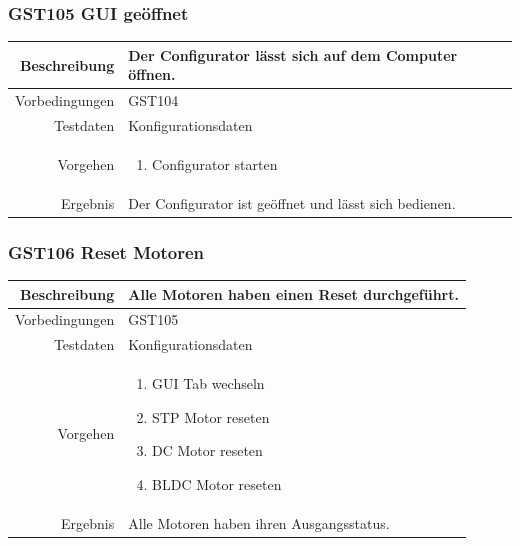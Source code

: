 \subsubsection{GST105 GUI geöffnet}
\begin{table}[h!]
	\renewcommand{\arraystretch}{1.5}
	\begin{tabular}{|r|p{14cm}|}
		\hline Beschreibung & Der Configurator lässt sich auf dem Computer öffnen. \\ 
		\hline Vorbedingungen &  GST104\\ 
		\hline Testdaten & Konfigurationsdaten \\ 
		\hline Vorgehen & 
		\begin{enumerate}
			\item Configurator starten
		\end{enumerate} \\ 
		\hline Ergebnis & Der Configurator ist geöffnet und lässt sich bedienen. \\ 
		\hline 
	\end{tabular}
\end{table}
\newpage

\subsubsection{GST106 Reset Motoren}
\begin{table}[h!]
	\renewcommand{\arraystretch}{1.5}
	\begin{tabular}{|r|p{14cm}|}
		\hline Beschreibung & Alle Motoren haben einen Reset durchgeführt. \\ 
		\hline Vorbedingungen &  GST105\\ 
		\hline Testdaten & Konfigurationsdaten \\ 
		\hline Vorgehen & 
		\begin{enumerate}
			\item GUI Tab wechseln
			\item STP Motor reseten
			\item DC Motor reseten
			\item BLDC Motor reseten
		\end{enumerate} \\ 
		\hline Ergebnis & Alle Motoren haben ihren Ausgangsstatus. \\ 
		\hline 
	\end{tabular}
\end{table}

